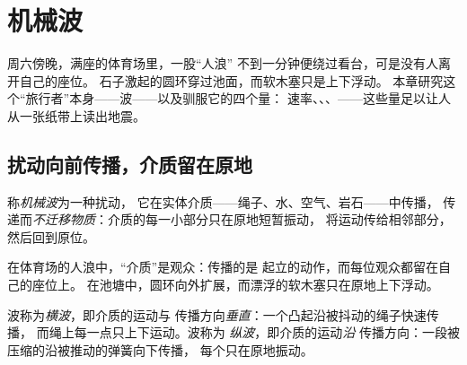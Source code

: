 \chapter{机械波}\label{ch:g12:mechanical-waves}

周六傍晚，满座的体育场里，一股“人浪”
不到一分钟便绕过看台，可是没有人离开自己的座位。
石子激起的圆环穿过池面，而软木塞只是上下浮动。
本章研究这个“旅行者”本身——波——以及驯服它的四个量：
速率、、、——这些量足以让人
从一张纸带上读出地震。

\section{扰动向前传播，介质留在原地}

\begin{definition}[机械波]\label{def:g12:mechanical-waves:wave}
称\emph{机械波}为一种扰动，
它在实体介质——绳子、水、空气、岩石——中传播，
传递而\emph{不迁移物质}：介质的每一小部分只在原地短暂振动，
将运动传给相邻部分，然后回到原位。
\end{definition}

\begin{example}[物质不随波迁移]\label{ex:g12:mechanical-waves:transport}
在体育场的人浪中，“介质”是观众：传播的是
起立的动作，而每位观众都留在自己的座位上。
在池塘中，圆环向外扩展，而漂浮的软木塞只在原地上下浮动。
\end{example}

\begin{definition}[横波与纵波]\label{def:g12:mechanical-waves:transverse}
波称为\emph{横波}，即介质的运动与
传播方向\emph{垂直}：一个凸起沿被抖动的绳子快速传播，
而绳上每一点只上下运动。波称为
\emph{纵波}，即介质的运动\emph{沿}
传播方向：一段被压缩的沿被推动的弹簧向下传播，
每个只在原地振动。
\end{definition}

